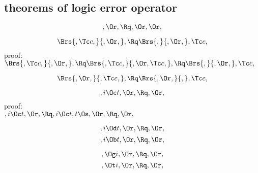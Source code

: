 \subsection{theorems of logic error operator}

\[, \Or, \Rq , \Or, \Or,\]


\[\Brs{,\Tc c,}{,\Or,} , \Rq \Brs{,}{,\Or,},\Tc c,\]
\bigskip
proof:\\
\begin{math} 
 \Brs{,\Tc c,}{,\Or,} ,\\\\
\Rq \Brs{,\Tc c,}{,\Or,\Tc c,} , \\\\
\Rq \Brs{,}{,\Or,} ,\Tc c,
\end{math}
\bigskip



\[\Brs{,\Or,}{,\Tc c,}, \Rq \Brs{,\Or,}{,},\Tc c,\]


\[,i \Oc t, \Or, \Rq ,\Or,\]
\bigskip
proof:\\
\begin{math} 
,i \Oc t, \Or,\\\\
\Rq ,i \Oc t,  t \Os, \Or, \\\\
\Rq ,\Or,
\end{math}
\bigskip


\[,i \Od t, \Or, \Rq ,\Or,\]
\[,i \Ob t, \Or, \Rq ,\Or,\]

\[, \Og i, \Or, \Rq ,\Or,\]
\[, \Ot i, \Or, \Rq ,\Or,\]



\newpage


